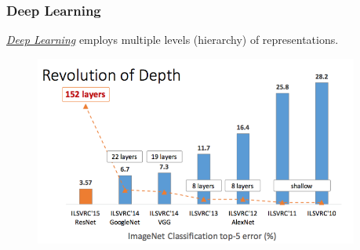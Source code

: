 \documentclass{beamer}
\begin{document}
\begin{frame}
\frametitle{Deep Learning}

\href{https://en.wikipedia.org/wiki/Deep_learning}{\emph{Deep Learning}} employs multiple levels (hierarchy) of representations.

\begin{figure}[!h]
\begin{center}
\includegraphics[width=0.95\textwidth]{figures/revo_in_depth.png}
\end{center}
\end{figure}


\end{frame}
% 
% 
% 
\end{document}
